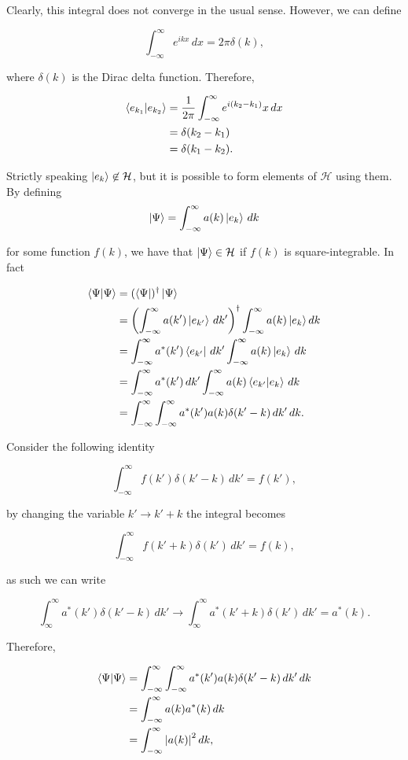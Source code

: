 \documentclass[12pt, a4paper]{article}
\begin{document}
Clearly, this integral does not converge in the usual sense. However, we can define 

\[\int_{-\infty}^{\infty} e^{ikx} \, dx = 2\pi \delta(k),\]

where \(\delta(k)\) is the Dirac delta function. Therefore,

\[\begin{aligned}
    \bra{e_{k_1}} \ket{e_{k_2}} &= \frac{1}{2\pi} \int_{-\infty}^{\infty} e^{i(k_2-k_1)}x \, dx \\
    &= \delta(k_2-k_1)\\ 
    &= \delta(k_1-k_2).
\end{aligned}\]

Strictly speaking \(\ket{e_k} \not\in \mathcal{H}\), but it is possible to form elements of \(\mathcal{H}\) using them. By defining 
\[\ket{\Psi} = \int_{-\infty}^{\infty} a(k) \ket{e_k} \, dk\]

for some function \(f(k)\), we have that \(\ket{\Psi} \in \mathcal{H}\) if \(f(k)\) is square-integrable. In fact 

\[\begin{aligned}
    \bra{\Psi}\ket{\Psi} &=(\bra{\Psi})^{\dagger} \ket{\Psi} \\
    &= \left( \int_{-\infty}^{\infty} a(k') \ket{e_{k'}} \, dk' \right)^{\dagger} \int_{-\infty}^{\infty} a(k) \ket{e_{k}} dk \\
    &= \int_{-\infty}^{\infty} a^*(k') \bra{e_{{k'}}} \, dk' \int_{-\infty}^{\infty} a(k) \ket{e_{k}} \, dk \\
    &= \int_{-\infty}^{\infty} a^*(k') \, dk' \int_{-\infty}^{\infty} a(k) \bra{e_{k'}} \ket{e_{k}} \, dk \\
    &= \int_{-\infty}^{\infty} \int_{-\infty}^{\infty} a^*(k') a(k) \delta(k'-k) \, dk' \, dk.
\end{aligned}\]

Consider the following identity

\[\int_{-\infty}^{\infty} f(k')\delta(k'-k) \, dk' =f(k'),\]

by changing the variable \(k' \to k'+k\) the integral becomes 

\[\int_{-\infty}^{\infty} f(k'+k) \delta(k') \, dk' = f(k),\]

as such we can write 

\[\int_{\infty}^{\infty} a^*(k') \delta(k'-k) \, dk' \to \int_{\infty}^{\infty} a^*(k'+k) \delta(k') \, dk' = a^*(k).\]


Therefore, 

\[\begin{aligned}
    \bra{\Psi}\ket{\Psi} &=\int_{-\infty}^{\infty} \int_{-\infty}^{\infty} a^*(k') a(k) \delta(k'-k) \, dk' \, dk \\
    &= \int_{-\infty}^{\infty} a(k) a^*(k) \, dk \\
    &= \int_{-\infty}^{\infty} \abs{a(k)}^2 \, dk,
\end{aligned}\]
\end{document}
